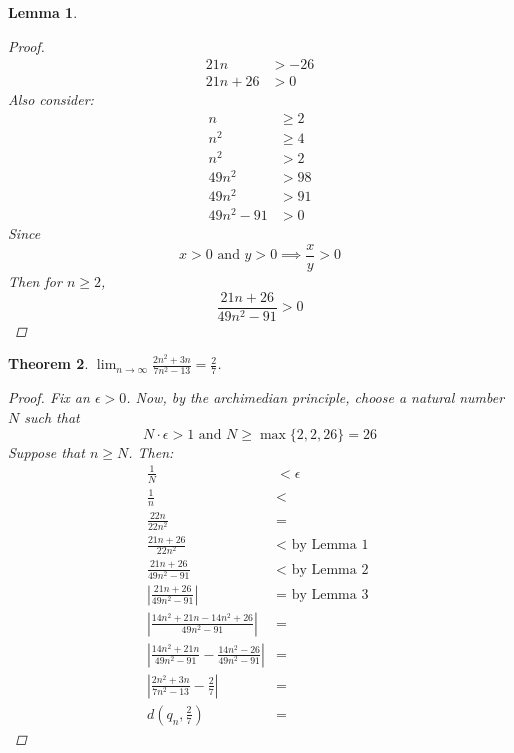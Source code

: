 \documentclass{amsart}
\newtheorem{theorem}{Theorem}
\newtheorem{lemma}[theorem]{Lemma}
\begin{document}
\begin{enumerate}[1.]
\begin{lemma}
\begin{proof}
\begin{align*}
			21n &> -26 \\
			21n + 26 &> 0
		\end{align*}
		Also consider:
		\begin{align*}
			n &\geq 2 \\
			n^2 &\geq 4 \\
			n^2 &> 2 \\
			49n^2 &> 98 \\
			49n^2 &> 91 \\
			49n^2 -91 &> 0
		\end{align*}
		Since 
		\[
			x > 0 \text{ and } y > 0 \implies \frac{x}{y} > 0	
		\]
		Then for $n \geq 2$,
		\[
			\frac{21n + 26}{49n^2 -91} > 0	
		\]
	\end{proof}
\end{lemma}
\begin{theorem}
	$\lim_{n \to \infty} \frac{2n^2+3n}{7n^2-13} = \frac{2}{7}$.
	\begin{proof}
		Fix an $\epsilon > 0$. Now, by the archimedian principle, choose a natural number $N$ such that
		\[
			N\cdot\epsilon > 1 \text{ and } N \geq\max\{2,2,26\} = 26
		\]
		Suppose that $n \geq N$. Then:
		\begin{align*}
			\frac{1}{N} &< \epsilon \\
			\frac{1}{n} &< \\
			\frac{22n}{22n^2} &= \\
			\frac{21n + 26}{22n^2} &< \text{ by Lemma 1 }\\ 
			\frac{21n + 26}{49n^2 - 91} &< \text{ by Lemma 2 } \\
			\left|\frac{21n + 26}{49n^2 - 91}\right| &= \text{ by Lemma 3 }\\
			\left|\frac{14n^2 + 21n - 14n^2 + 26}{49n^2 - 91}\right| &= \\
			\left|\frac{14n^2 + 21n}{49n^2 - 91} - \frac{14n^2 - 26}{49n^2 - 91}\right| &= \\
			\left|\frac{2n^2 + 3n}{7n^2 - 13} - \frac{2}{7}\right| &= \\
			d\left(q_n, \frac{2}{7}\right) &=
		\end{align*}
	\end{proof}
\end{theorem}

\newpage


\end{enumerate}
\end{document}
